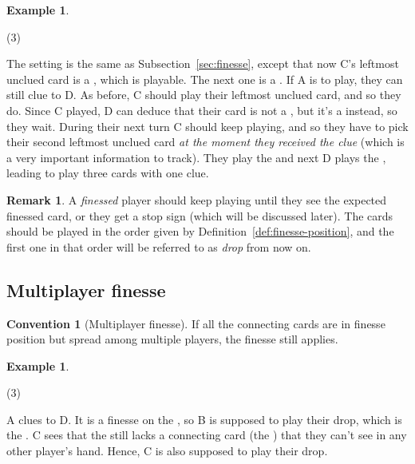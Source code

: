 \documentclass[a4paper]{article}
\theoremstyle{plain}
\theoremstyle{definition}
\newtheorem{remark}[theorem]{Remark}
\newtheorem{example}[theorem]{Example}
\newtheorem{convention}[theorem]{Convention}
\begin{document}
\begin{example}
	\hfill
	\begin{tasks}(3)
		\task[+]      
		\task[A]    
		\task[B]    
		\task[C]    
		\task[D]    
		\task[E]    
	\end{tasks}
	
	The setting is the same as Subsection~\ref{sec:finesse}, except that now C's leftmost unclued card is a , which is playable. The next one is a . If A is to play, they can still clue  to D. As before, C should play their leftmost unclued card, and so they do. Since C played, D can deduce that their card is not a , but it's a  instead, so they wait. During their next turn C should keep playing, and so they have to pick their second leftmost unclued card \textit{at the moment they received the clue} (which is a very important information to track). They play the  and next D plays the , leading to play three cards with one clue.
\end{example}

\begin{remark}
	A \textit{finessed} player should keep playing until they see the expected finessed card, or they get a stop sign (which will be discussed later). The cards should be played in the order given by Definition~\ref{def:finesse-position}, and the first one in that order will be referred to as \emph{drop} from now on.
\end{remark}

\subsection{Multiplayer finesse}

\begin{convention}[Multiplayer finesse]
	\label{multiplayer-finesse}
	If all the connecting cards are in finesse position but spread among multiple players, the finesse still applies.
\end{convention}

\begin{example}
	\hfill
	\begin{tasks}(3)
		\task[+]      
		\task[A]    
		\task[B]    
		\task[C]    
		\task[D]    
		\task[E]    
	\end{tasks}
	
	A clues  to D. It is a finesse on the , so B is supposed to play their drop, which is the . C sees that the  still lacks a connecting card (the ) that they can't see in any other player's hand. Hence, C is also supposed to play their drop.
\end{example}
\end{document}
